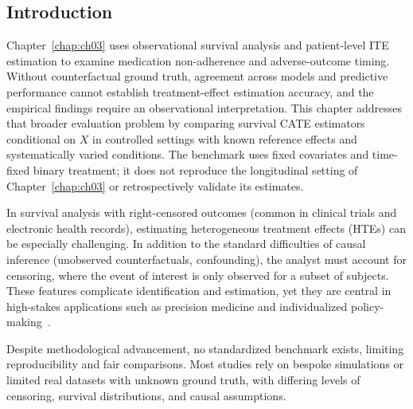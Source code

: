 \subsection{Introduction}
\label{ch04:sec:intro}

Chapter~\ref{chap:ch03} uses observational survival analysis and patient-level ITE estimation to examine medication non-adherence and adverse-outcome timing.
Without counterfactual ground truth, agreement across models and predictive performance cannot establish treatment-effect estimation accuracy, and the empirical findings require an observational interpretation.
This chapter addresses that broader evaluation problem by comparing survival CATE estimators conditional on $X$ in controlled settings with known reference effects and systematically varied conditions.
The benchmark uses fixed covariates and time-fixed binary treatment; it does not reproduce the longitudinal setting of Chapter~\ref{chap:ch03} or retrospectively validate its estimates.

In survival analysis with right-censored outcomes (common in clinical trials and electronic health records), estimating heterogeneous treatment effects (HTEs) can be especially challenging.
In addition to the standard difficulties of causal inference (unobserved counterfactuals, confounding), the analyst must account for censoring, where the event of interest is only observed for a subset of subjects.
These features complicate identification and estimation, yet they are central in high-stakes applications such as precision medicine and individualized policy-making~\citep{zhu2020targeted,chapfuwa2021enabling,curth2021survite}.

Despite methodological advancement, no standardized benchmark exists, limiting reproducibility and fair comparisons. 
Most studies rely on bespoke simulations or limited real datasets with unknown ground truth, with differing levels of censoring, survival distributions, and causal assumptions.

